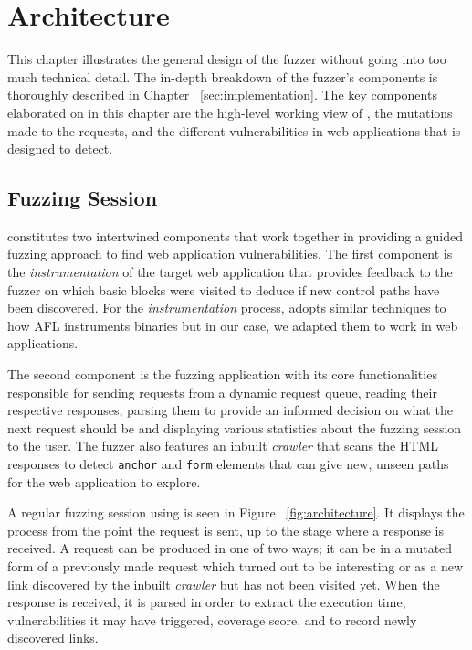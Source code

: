 \chapter{Architecture}
\label{sec:architecture}
\minitoc
\vspace*{1cm}

This chapter illustrates the general design of the fuzzer without going into too much technical detail. The in-depth breakdown of the fuzzer's components is thoroughly described in Chapter ~\ref{sec:implementation}. The key components elaborated on in this chapter are the high-level working view of \pname{}, the mutations made to the requests, and the different vulnerabilities in web applications that \pname{} is designed to detect.

\section{Fuzzing Session}
\pname{} constitutes two intertwined components that work together in providing a guided fuzzing approach to find web application vulnerabilities. The first
component is the \emph{instrumentation} of the target web application that provides feedback to the fuzzer on which basic blocks were visited to deduce if new control paths have been discovered. For the \emph{instrumentation} process, \pname{} adopts similar techniques to how AFL instruments binaries but in our case, we adapted them to work in web applications. 

The second component is the fuzzing application with its core functionalities responsible for sending requests from a dynamic request queue, reading their respective responses, parsing them to provide an informed decision on what the next request should be and displaying various statistics about the fuzzing session to the user. The fuzzer also features an inbuilt \emph{crawler} that scans the HTML responses to detect {\tt anchor} and {\tt form} elements that can give new, unseen paths for the web application to explore.

A regular fuzzing session using \pname{} is seen in Figure ~\ref{fig:architecture}. It displays the process from the point the request is sent, up to the stage where a response is received. A request can be produced in one of two ways; it can be in a mutated form of a previously made request which turned out to be interesting or as a new link discovered by the inbuilt \emph{crawler} but has not been visited yet. When the response is received, it is parsed in order to extract the execution time, vulnerabilities it may have triggered, coverage score, and to record newly discovered links.

